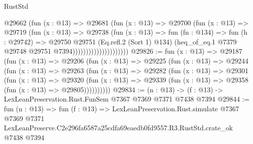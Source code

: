 \begin{lexlean}{RustStd}
\begin{coremodule}
                                @29662
                                  (fun (x : @13) =>
                                  @29681
                                    (fun (x : @13) =>
                                    @29700
                                      (fun (x : @13) =>
                                      @29719
                                        (fun (x : @13) =>
                                        @29738
                                          (fun (x : @13) =>
                                          fun (fn : @134) =>
                                          fun (h : @29742) =>
                                          @29750
                                            @29751
                                            (Eq.refl.{2} (Sort 1) @134)
                                            (heq_of_eq.{1}
                                              @7379
                                              @29748
                                              @29751
                                              @7394)))))))))))))))))))))
@29826 := fun (x : @13) =>
  @29187
    (fun (x : @13) =>
    @29206
      (fun (x : @13) =>
      @29225
        (fun (x : @13) =>
        @29244
          (fun (x : @13) =>
          @29263
            (fun (x : @13) =>
            @29282
              (fun (x : @13) =>
              @29301
                (fun (x : @13) =>
                @29320
                  (fun (x : @13) =>
                  @29339 (fun (x : @13) => @29358 (fun (x : @13) => @29805))))))))))
@29834 := (n : @13) -> (f : @13) -> LexLeanPreservation.Rust.FunSem @7367 @7369 @7371 @7438 @7394
@29844 := fun (n : @13) =>
  fun (f : @13) =>
  LexLeanPreservation.Rust.simulate
    @7367
    @7369
    @7371
    LexLeanPreserve.C2e296fa6587a25cdfa69eaedb0fd9557.R3.RustStd.crate_ok
    @7438
    @7394
\end{coremodule}
\end{lexlean}

